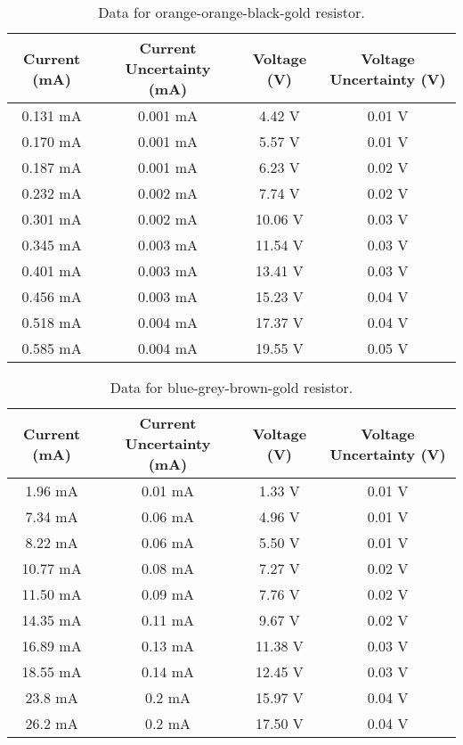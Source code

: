 \documentclass[11pt]{article}
\begin{document}
\begin{table}[htb]
    \caption{\label{tab:tab2}Data for orange-orange-black-gold resistor.}
    \vspace{1em}\hline\hline\vspace{0.3em}\centering
    \begin{tabular}{cccc}
        Current (mA)&Current Uncertainty (mA)&Voltage (V)&Voltage Uncertainty (V)\\
        \hline
0.131 mA&0.001 mA&4.42 V&0.01 V\\
0.170 mA&0.001 mA&5.57 V&0.01 V\\
0.187 mA&0.001 mA&6.23 V&0.02 V\\
0.232 mA&0.002 mA&7.74 V&0.02 V\\
0.301 mA&0.002 mA&10.06 V&0.03 V\\
0.345 mA&0.003 mA&11.54 V&0.03 V\\
0.401 mA&0.003 mA&13.41 V&0.03 V\\
0.456 mA&0.003 mA&15.23 V&0.04 V\\
0.518 mA&0.004 mA&17.37 V&0.04 V\\
0.585 mA&0.004 mA&19.55 V&0.05 V\\

    \end{tabular}
    \hline\hline
\end{table}

\begin{table}[htb]
    \caption{\label{tab:tab3}Data for blue-grey-brown-gold resistor.}
    \vspace{1em}\hline\hline\vspace{0.3em}\centering
    \begin{tabular}{cccc}
        Current (mA)&Current Uncertainty (mA)&Voltage (V)&Voltage Uncertainty (V)\\
        \hline

1.96 mA&0.01 mA&1.33 V&0.01 V\\
7.34 mA&0.06 mA&4.96 V&0.01 V\\
8.22 mA&0.06 mA&5.50 V&0.01 V\\
10.77 mA&0.08 mA&7.27 V&0.02 V\\
11.50 mA&0.09 mA&7.76 V&0.02 V\\
14.35 mA&0.11 mA&9.67 V&0.02 V\\
16.89 mA&0.13 mA&11.38 V&0.03 V\\
18.55 mA&0.14 mA&12.45 V&0.03 V\\
23.8 mA&0.2 mA&15.97 V&0.04 V\\
26.2 mA&0.2 mA&17.50 V&0.04 V\\

    \end{tabular}
    \hline\hline
\end{table}
\end{document}
